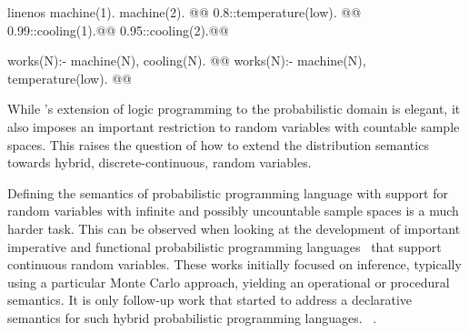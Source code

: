 \begin{example}
  \label{example:intro}

  \begin{problog*}{linenos}
machine(1). machine(2). @\label{line:exintro:1}@
0.8::temperature(low). @\label{line:exintro:temp}@
0.99::cooling(1).@\label{line:exintro:cool1}@
0.95::cooling(2).@\label{line:exintro:cool2}@

works(N):- machine(N), cooling(N). @\label{line:exintro:work1}@
works(N):- machine(N), temperature(low). @\label{line:exintro:work2}@

    \end{problog*}
\end{example}

While \citeauthor{sato1995statistical}'s extension of logic programming to the probabilistic domain is elegant, it also imposes an important restriction to random variables with countable sample spaces. This raises the question of how to extend the distribution semantics towards hybrid, \ie discrete-continuous, random variables.

Defining the semantics of probabilistic programming language with support for random variables with infinite and possibly uncountable sample spaces is a much harder task. This can be observed when looking at the development of important imperative and functional probabilistic programming languages~\citep{goodman2008church,mansinghka2014venture} that support  continuous random variables. 
These works initially focused on inference, typically using  a particular Monte Carlo approach, yielding  an operational or procedural semantics. It is only follow-up work that started to address a declarative semantics for such hybrid probabilistic programming languages.
~\citep{staton2016semantics,wu2018discrete}.

